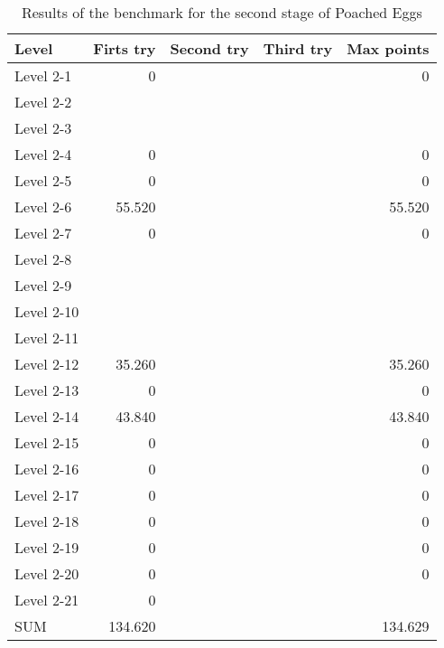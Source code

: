 \begin{table}[h]
	\begin{center}
		\begin{tabular}{l | r r r r}
			Level & Firts try & Second try & Third try & Max points \\
			\hline
			\hline
			Level 2-1  &  0       &         &         &       0 \\
			\hline
			Level 2-2  &          &         &         &         \\
			\hline
			Level 2-3  &          &         &         &         \\
			\hline
			Level 2-4  &  0       &         &         &       0 \\
			\hline
			Level 2-5  &  0       &         &         &       0 \\
			\hline
			Level 2-6  &  55.520  &         &         &  55.520 \\
			\hline
			Level 2-7  &  0       &         &         &       0 \\
			\hline
			Level 2-8  &          &         &         &         \\
			\hline
			Level 2-9  &          &         &         &         \\
			\hline
			Level 2-10 &          &         &         &         \\
			\hline
			Level 2-11 &          &         &         &         \\
			\hline
			Level 2-12 &  35.260  &         &         &  35.260 \\
			\hline
			Level 2-13 &  0       &         &         &       0 \\
			\hline
			Level 2-14 &  43.840  &         &         &  43.840 \\
			\hline
			Level 2-15 &  0       &         &         &       0 \\
			\hline
			Level 2-16 &  0       &         &         &       0 \\
			\hline
			Level 2-17 &  0       &         &         &       0 \\
			\hline
			Level 2-18 &  0       &         &         &       0 \\
			\hline
			Level 2-19 &  0       &         &         &       0 \\
			\hline
			Level 2-20 &  0       &         &         &       0 \\
			\hline
			Level 2-21 &  0       &         &         &         \\
			\hline
			\hline
			SUM        & 134.620  &         &         & 134.629
		\end{tabular}
	\end{center}
	\caption{Results of the benchmark for the second stage of Poached Eggs\label{tab:stage2}}
\end{table}

